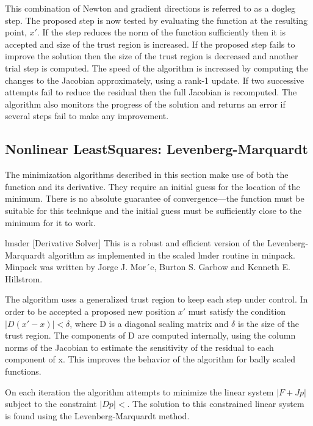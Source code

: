 This combination of Newton and gradient directions is referred to as a dogleg step.
The proposed step is now tested by evaluating the function at the resulting point, $x′$.
If the step reduces the norm of the function sufficiently then it is accepted and size of
the trust region is increased. If the proposed step fails to improve the solution then
the size of the trust region is decreased and another trial step is computed.
The speed of the algorithm is increased by computing the changes to the Jacobian approximately,
using a rank-1 update. If two successive attempts fail to reduce the residual
then the full Jacobian is recomputed. The algorithm also monitors the progress
of the solution and returns an error if several steps fail to make any improvement.







\subsection{Nonlinear LeastSquares: Levenberg-Marquardt }
The minimization algorithms described in this section make use of both the function and
its derivative. They require an initial guess for the location of the minimum. There is no
absolute guarantee of convergence—the function must be suitable for this technique and
the initial guess must be sufficiently close to the minimum for it to work.


lmsder [Derivative Solver]
This is a robust and efficient version of the Levenberg-Marquardt algorithm as implemented
in the scaled lmder routine in minpack. Minpack was written by Jorge
J. Mor´e, Burton S. Garbow and Kenneth E. Hillstrom.


The algorithm uses a generalized trust region to keep each step under control. In order
to be accepted a proposed new position $x′$ must satisfy the condition $|D(x′ −x)| < \delta$,
where D is a diagonal scaling matrix and $\delta$ is the size of the trust region. The
components of D are computed internally, using the column norms of the Jacobian
to estimate the sensitivity of the residual to each component of x. This improves the
behavior of the algorithm for badly scaled functions.


On each iteration the algorithm attempts to minimize the linear system $|F + Jp|$ subject to the constraint $|Dp| < $. The solution to this constrained linear system is found using the Levenberg-Marquardt method.

